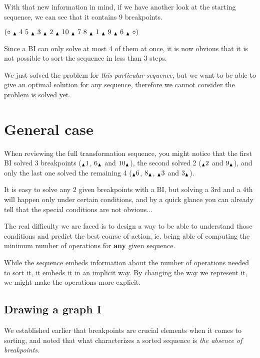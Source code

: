 \documentclass[11pt,final,twoside,nofrench]{thlifl}
\newcommand{\breakpoint}{ \textsubscript{$\textcolor{black}{\blacktriangle}$} }
\begin{document}
With that new information in mind, if we have another look at the starting sequence, we can see that it contains 9 breakpoints.

\begin{center}
$(\circ~\breakpoint~4~5~\breakpoint~3~\breakpoint~2~\breakpoint~10~\breakpoint~7~8~\breakpoint~1~\breakpoint~9~\breakpoint~6~\breakpoint~\circ)$
\end{center}

Since a BI can only solve at most 4 of them at once, it is now obvious that it is not possible to sort the sequence in less than 3 steps.

We just solved the problem for \emph{this particular sequence}, but we want to be able to give an optimal solution for any sequence, therefore we cannot consider the problem is solved yet.

\section{General case}

When reviewing the full transformation sequence, you might notice that the first BI solved 3 breakpoints ($\breakpoint1$,  $6\breakpoint$ and $10\breakpoint$), the second solved 2 ($\breakpoint2$ and $9\breakpoint$), and only the last one solved the remaining 4 ($\breakpoint6$, $8\breakpoint$, $\breakpoint3$ and $3\breakpoint$).

It is easy to solve any 2 given breakpoints with a BI, but solving a 3rd and a 4th will happen only under certain conditions, and by a quick glance you can already tell that the special conditions are not obvious...

The real difficulty we are faced is to design a way to be able to understand those conditions and predict the best course of action, ie. being able of computing the minimum number of operations for \textbf{any} given sequence.

While the sequence embeds information about the number of operations needed to sort it, it embeds it in an implicit way. By changing the way we represent it, we might make the operations more explicit.

\subsection{Drawing a graph I}

We established earlier that breakpoints are crucial elements when it comes to sorting, and noted that what characterizes a sorted sequence is \emph{the absence of breakpoints}.
\end{document}
